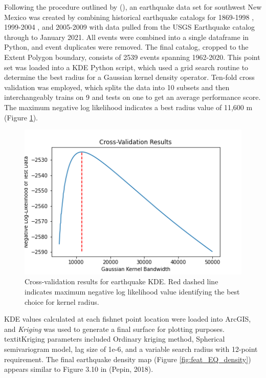 Following the procedure outlined by \citeauthor{pepin_new_2018} (\citeyear{pepin_new_2018}), an earthquake data set for southwest New Mexico was created by combining historical earthquake catalogs for 1869-1998 \citep{sanford_earthquake_2002}, 1999-2004 \citep{sanford_earthquake_2006}, and 2005-2009 \citep{pursley_earthquake_2013} with data pulled from the USGS Earthquake catalog \citep{usgs_earthquake_2021} through to January 2021. All events were combined into a single dataframe in Python, and event duplicates were removed. The final catalog, cropped to the Extent Polygon boundary, consists of 2539 events spanning 1962-2020. This point set was loaded into a KDE Python script, which used a grid search routine to determine the best radius for a Gaussian kernel density operator. Ten-fold cross validation was employed, which splits the data into 10 subsets and then interchangeably trains on 9 and tests on one to get an average performance score. The maximum negative log likelihood indicates a best radius value of 11,600 m (Figure \ref{fig:EQ_cv}). 

\begin{figure}[!htp]
\centering
\includegraphics[scale=.50]{templates/images/Figure-Earthquake_kde_gridsearchcv_result.png}
\caption[Earthquake density parameter tuning]{Cross-validation results for earthquake KDE. Red dashed line indicates maximum negative log likelihood value identifying the best choice for kernel radius.}
\label{fig:EQ_cv}
\end{figure}

KDE values calculated at each fishnet point location were loaded into ArcGIS, and \textit{Kriging} was used to generate a final surface for plotting purposes. textit{Kriging} parameters included Ordinary kriging method, Spherical semivariogram model, lag size of 1e-6, and a variable search radius with 12-point requirement. The final earthquake density map (Figure \ref{fig:feat_EQ_density}) appears similar to Figure 3.10 in (Pepin, 2018). 

